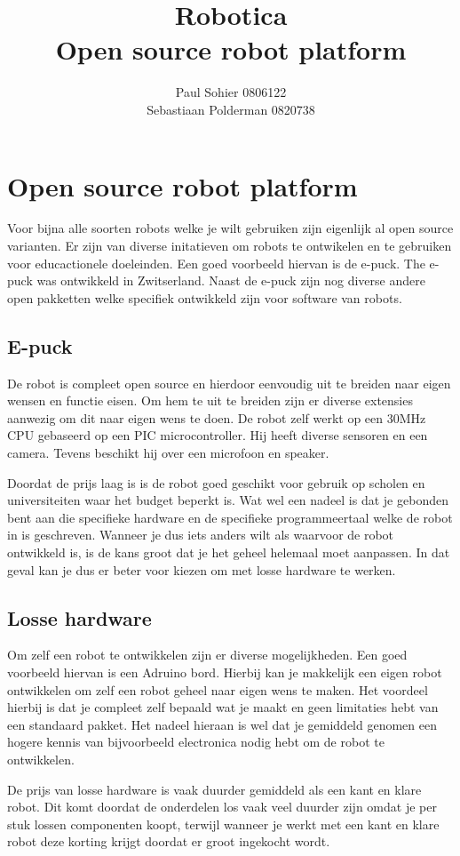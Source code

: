 \documentclass[a4paper,titlepage]{artikel1}
\author{Paul Sohier 0806122\\Sebastiaan Polderman 0820738}
\title{Robotica \\ Open source robot platform}
\begin{document}
\maketitle
\tableofcontents
\newpage
\section{Open source robot platform}
Voor bijna alle soorten robots welke je wilt gebruiken zijn eigenlijk al open source varianten. Er zijn van diverse initatieven om robots te ontwikelen en te gebruiken voor educactionele doeleinden. Een goed voorbeeld hiervan is de e-puck. The e-puck was ontwikkeld in Zwitserland. Naast de e-puck zijn nog diverse andere open pakketten welke specifiek ontwikkeld zijn voor software van robots.
\subsection{E-puck}
De robot is compleet open source en hierdoor eenvoudig uit te breiden naar eigen wensen en functie eisen. Om hem te uit te breiden zijn er diverse extensies aanwezig om dit naar eigen wens te doen.
De robot zelf werkt op een 30MHz CPU gebaseerd op een PIC microcontroller. Hij heeft diverse sensoren en een camera. Tevens beschikt hij over een microfoon en speaker.

Doordat de prijs laag is is de robot goed geschikt voor gebruik op scholen en universiteiten waar het budget beperkt is. Wat wel een nadeel is dat je gebonden bent aan die specifieke hardware en de specifieke programmeertaal welke de robot in is geschreven. Wanneer je dus iets anders wilt als waarvoor de robot ontwikkeld is, is de kans groot dat je het geheel helemaal moet aanpassen. In dat geval kan je dus er beter voor kiezen om met losse hardware te werken.

\subsection{Losse hardware}
Om zelf een robot te ontwikkelen zijn er diverse mogelijkheden. Een goed voorbeeld hiervan is een Adruino bord. Hierbij kan je makkelijk een eigen robot ontwikkelen om zelf een robot geheel naar eigen wens te maken. Het voordeel hierbij is dat je compleet zelf bepaald wat je maakt en geen limitaties hebt van een standaard pakket. Het nadeel hieraan is wel dat je gemiddeld genomen een hogere kennis van bijvoorbeeld electronica nodig hebt om de robot te ontwikkelen.

De prijs van losse hardware is vaak duurder gemiddeld als een kant en klare robot. Dit komt doordat de onderdelen los vaak veel duurder zijn omdat je per stuk lossen componenten koopt, terwijl wanneer je werkt met een kant en klare robot deze korting krijgt doordat er groot ingekocht wordt.
\end{document}
